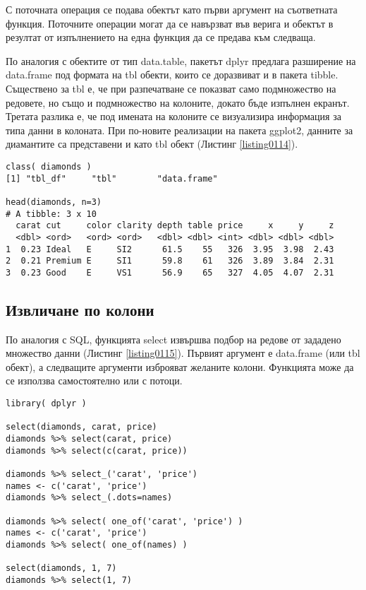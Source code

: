 С поточната операция се подава обектът като първи аргумент на съответната функция. Поточните операции могат да се навързват във верига и обектът в резултат от изпълнението на една функция да се предава към следваща.

По аналогия с обектите от тип data.table, пакетът dplyr предлага разширение на data.frame под формата на tbl обекти, които се доразвиват и в пакета tibble. Съществено за tbl е, че при разпечатване се показват само подмножество на редовете, но също и подмножество на колоните, докато бъде изпълнен екранът. Третата разлика е, че под имената на колоните се визуализира информация за типа данни в колоната. При по-новите реализации на пакета ggplot2, данните за диамантите са представени и като tbl обект (Листинг \ref{listing0114}).

\begin{lstlisting}[caption=Таблични данни в dplyr, label=listing0114]
class( diamonds )
[1] "tbl_df"     "tbl"        "data.frame"

head(diamonds, n=3)
# A tibble: 3 x 10
  carat cut     color clarity depth table price     x     y     z
  <dbl> <ord>   <ord> <ord>   <dbl> <dbl> <int> <dbl> <dbl> <dbl>
1  0.23 Ideal   E     SI2      61.5    55   326  3.95  3.98  2.43
2  0.21 Premium E     SI1      59.8    61   326  3.89  3.84  2.31
3  0.23 Good    E     VS1      56.9    65   327  4.05  4.07  2.31
\end{lstlisting}

\subsection{Извличане по колони}

По аналогия с SQL, функцията select извършва подбор на редове от зададено множество данни (Листинг \ref{listing0115}). Първият аргумент е data.frame (или tbl обект), а следващите аргументи изброяват желаните колони. Функцията може да се използва самостоятелно или с потоци.

\begin{lstlisting}[caption=Избор на редове, label=listing0115]
library( dplyr )

select(diamonds, carat, price)
diamonds %>% select(carat, price)
diamonds %>% select(c(carat, price))

diamonds %>% select_('carat', 'price')
names <- c('carat', 'price')
diamonds %>% select_(.dots=names)

diamonds %>% select( one_of('carat', 'price') )
names <- c('carat', 'price')
diamonds %>% select( one_of(names) )

select(diamonds, 1, 7)
diamonds %>% select(1, 7)
\end{lstlisting}

